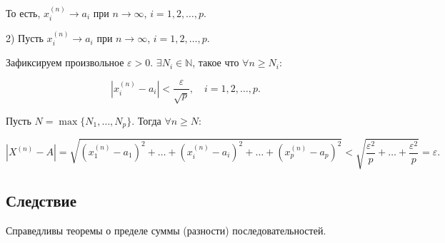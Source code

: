 {То есть, \( x_i^{(n)} \to a_i \) при \( n \to \infty \), \( i = 1, 2, \ldots, p \).

2) Пусть \( x_i^{(n)} \to a_i \) при \( n \to \infty \), \( i = 1, 2, \ldots, p \).

Зафиксируем произвольное \( \varepsilon > 0 \). \( \exists N_i \in \mathbb{N} \), такое что \( \forall n \geq N_i \):



\[
|x_i^{(n)} - a_i| < \frac{\varepsilon}{\sqrt{p}}, \quad i = 1, 2, \ldots, p.
\]



Пусть \( N = \max \{N_1, \dots, N_p\} \). Тогда \( \forall n \geq N \):



\[
|X^{(n)} - A| = \sqrt{(x_1^{(n)} - a_1)^2 + \ldots + (x_i^{(n)} - a_i)^2 + \ldots + (x_p^{(n)} - a_p)^2} < \sqrt{\frac{\varepsilon^2}{p} + \ldots + \frac{\varepsilon^2}{p}} = \varepsilon.
\]

\subsection*{Следствие}

Справедливы теоремы о пределе суммы (разности) последовательностей.




}
